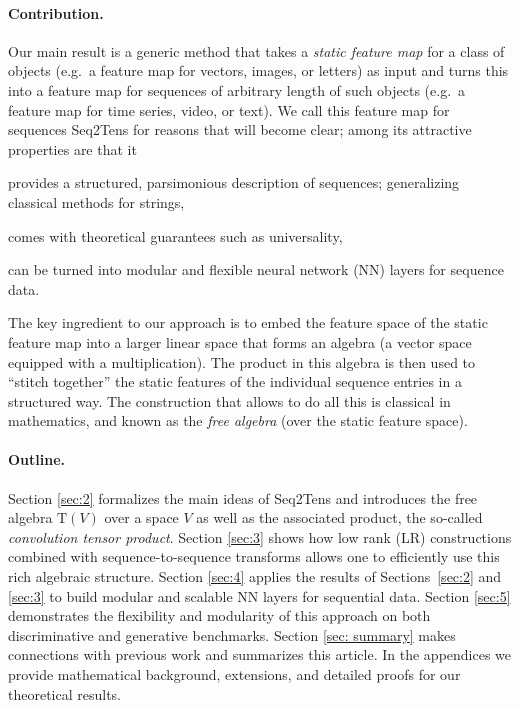 \documentclass{article} \usepackage{iclr2021_conference,times}
\newcommand{\T}[1]{\mathrm{T}({#1})}
\theoremstyle{plain}
\theoremstyle{definition}
\begin{document}
\paragraph{Contribution.}
Our main result is a generic method that takes a \emph{static feature map} for a class of objects (e.g.~a feature map for vectors, images, or letters) as input and turns this into a feature map for sequences of arbitrary length of such objects (e.g.~a feature map for time series, video, or text). 
We call this feature map for sequences Seq2Tens for reasons that will become clear; among its attractive properties are that it 
\begin{enumerate*}[label=(\roman*)]
\item provides a structured, parsimonious description of sequences; generalizing classical methods for strings, 
\item comes with theoretical guarantees such as universality,
\item can be turned into modular and flexible neural network (NN) layers for sequence data. 
\end{enumerate*}
The key ingredient to our approach is to embed the feature space of the static feature map into a larger linear space that forms an algebra (a vector space equipped with a multiplication).
The product in this algebra is then used to ``stitch together'' the static features of the individual sequence entries in a structured way.
The construction that allows to do all this is classical in mathematics, and known as the \emph{free algebra} (over the static feature space). 
\paragraph{Outline.}
Section \ref{sec:2} formalizes the main ideas of Seq2Tens and introduces the free algebra $\T{V}$ over a space $V$ as well as the associated product, the so-called \emph{convolution tensor product}. 
Section \ref{sec:3} shows how low rank (LR) constructions combined with sequence-to-sequence transforms allows one to efficiently use this rich algebraic structure. 
Section \ref{sec:4} applies the results of Sections~\ref{sec:2} and \ref{sec:3} to build modular and scalable NN layers for sequential data.
Section \ref{sec:5} demonstrates the flexibility and modularity of this approach on both discriminative and generative benchmarks.
Section \ref{sec: summary} makes connections with previous work and summarizes this article.   
In the appendices we provide mathematical background, extensions, and detailed proofs for our theoretical results.
\end{document}

